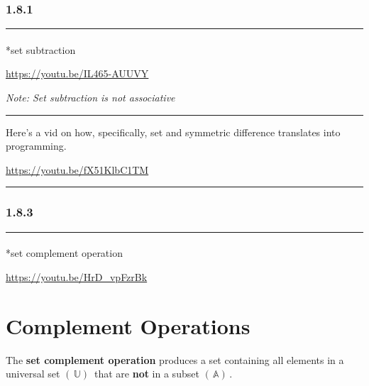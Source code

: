 \documentclass[
  letterpaper,
  DIV=11,
  numbers=noendperiod]{scrreprt}
\makeatletter
\let\oldparagraph\paragraph
\renewcommand{\paragraph}{
    \@ifstar
      \xxxParagraphStar
      \xxxParagraphNoStar
  }
\newcommand{\xxxParagraphStar}[1]{\oldparagraph*{#1}\mbox{}}
\newcommand{\xxxParagraphNoStar}[1]{\oldparagraph{#1}\mbox{}}
\makeatother
\begin{document}
\subsubsection*{1.8.1}\label{section-14}

\begin{center}\rule{0.5\linewidth}{0.5pt}\end{center}

\paragraph*{set subtraction}\label{set-subtraction}

\url{https://youtu.be/IL465-AUUVY}

\emph{Note: {Set subtraction} is not associative}

\begin{center}\rule{0.5\linewidth}{0.5pt}\end{center}

Here's a vid on how, specifically, set and symmetric difference
translates into programming.

\url{https://youtu.be/fX51KlbC1TM}

\begin{center}\rule{0.5\linewidth}{0.5pt}\end{center}

\subsubsection*{1.8.3}\label{section-15}

\begin{center}\rule{0.5\linewidth}{0.5pt}\end{center}

\paragraph*{set complement operation}\label{set-complement-operation}

\url{https://youtu.be/HrD_vpFzrBk}

\section{Complement Operations}

The \textbf{set complement operation} produces a set containing all
elements in a universal set \((\, \mathbb{U} )\,\) that are \textbf{not}
in a subset \((\, \mathbb{A} )\,\).
\end{document}
